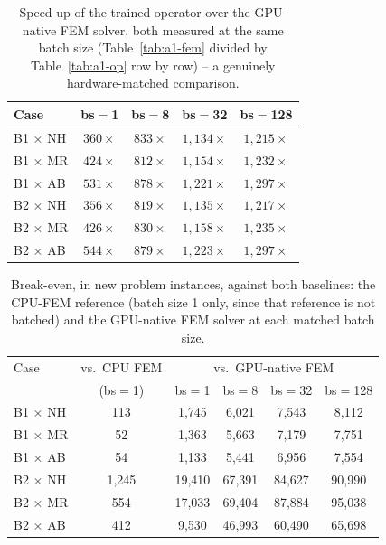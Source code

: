 \documentclass[final,5p,times]{elsarticle}
\begin{document}
\begin{table}[ht]
\centering
\caption{Speed-up of the trained operator over the GPU-native FEM
  solver, both measured at the same batch size (Table~\ref{tab:a1-fem}
  divided by Table~\ref{tab:a1-op} row by row) -- a genuinely
  hardware-matched comparison.}
\label{tab:a1-speedup}
\small
\begin{tabular}{lcccc}
\toprule
Case & bs$=$1 & bs$=$8 & bs$=$32 & bs$=$128 \\
\midrule
B1 $\times$ NH & $360\times$ & $833\times$   & $1{,}134\times$ & $1{,}215\times$ \\
B1 $\times$ MR & $424\times$ & $812\times$   & $1{,}154\times$ & $1{,}232\times$ \\
B1 $\times$ AB & $531\times$ & $878\times$   & $1{,}221\times$ & $1{,}297\times$ \\
B2 $\times$ NH & $356\times$ & $819\times$   & $1{,}135\times$ & $1{,}217\times$ \\
B2 $\times$ MR & $426\times$ & $830\times$   & $1{,}158\times$ & $1{,}235\times$ \\
B2 $\times$ AB & $544\times$ & $879\times$   & $1{,}223\times$ & $1{,}297\times$ \\
\bottomrule
\end{tabular}
\end{table}

\begin{table}[ht]
\centering
\caption{Break-even, in new problem instances, against both baselines:
  the CPU-FEM reference (batch size 1 only, since that reference is not
  batched) and the GPU-native FEM solver at each matched batch size.}
\label{tab:a1-breakeven}
\small
\begin{tabular}{lccccc}
\toprule
Case & vs.\ CPU FEM & \multicolumn{4}{c}{vs.\ GPU-native FEM} \\
 & (bs$=$1) & bs$=$1 & bs$=$8 & bs$=$32 & bs$=$128 \\
\midrule
B1 $\times$ NH & 113   & 1{,}745  & 6{,}021  & 7{,}543  & 8{,}112 \\
B1 $\times$ MR & 52    & 1{,}363  & 5{,}663  & 7{,}179  & 7{,}751 \\
B1 $\times$ AB & 54    & 1{,}133  & 5{,}441  & 6{,}956  & 7{,}554 \\
B2 $\times$ NH & 1{,}245 & 19{,}410 & 67{,}391 & 84{,}627 & 90{,}990 \\
B2 $\times$ MR & 554   & 17{,}033 & 69{,}404 & 87{,}884 & 95{,}038 \\
B2 $\times$ AB & 412   & 9{,}530  & 46{,}993 & 60{,}490 & 65{,}698 \\
\bottomrule
\end{tabular}
\end{table}
\end{document}
